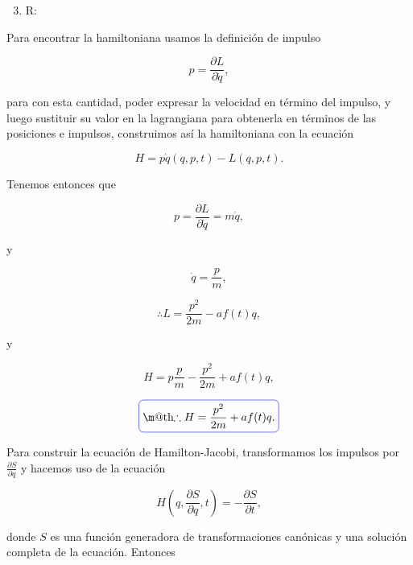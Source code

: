 \documentclass[a4paper,10pt]{article}
\makeatletter
\numberwithin{equation}{section}
\newcommand*{\boxcolor}{blue}
\renewcommand{\boxed}[1]{\textcolor{\boxcolor}{%
\tikz[baseline={([yshift=-1ex]current bounding box.center)}] \node [rectangle, minimum width=1ex,rounded corners,draw] {\normalcolor\m@th$\displaystyle#1$};}}
\makeatother
\begin{document}
\begin{enumerate}[label=\alph*)]
\setcounter{enumi}{2}
 \item R:
\end{enumerate}

Para encontrar la hamiltoniana usamos la definición de impulso 

\begin{equation}
 p = \frac{\partial L}{\partial \dot{q}},
\end{equation}

para con esta cantidad, poder expresar la velocidad en término del impulso, y luego 
sustituir su valor en la lagrangiana para obtenerla en términos de las posiciones 
e impulsos, construimos así la hamiltoniana con la ecuación 

\begin{equation}
 H = p\dot{q}(q,p,t) - L(q,p,t).
\end{equation}

Tenemos entonces que 

\begin{equation}
 p = \frac{\partial L}{\partial \dot{q}} = m\dot{q},
\end{equation}

y 

\begin{equation}
 \dot{q} = \frac{p}{m},
\end{equation}

\begin{equation}
 \therefore L = \frac{p^2}{2m} - af(t)q,
\end{equation}

y

\begin{equation}
 H = p\frac{p}{m} - \frac{p^2}{2m} + af(t)q,
\end{equation}

\begin{equation}
 \boxed{\therefore H = \frac{p^2}{2m} + af(t)q.}
\end{equation}

Para construir la ecuación de Hamilton-Jacobi, transformamos los impulsos por 
$\frac{\partial S}{\partial q}$ y hacemos uso de la ecuación 

\begin{equation}
 H\left(q,\frac{\partial S}{\partial q},t\right) = - \frac{\partial S}{\partial t},
\end{equation}

donde $S$ es una función generadora de transformaciones canónicas y una solución 
completa de la ecuación. Entonces 
\end{document}
